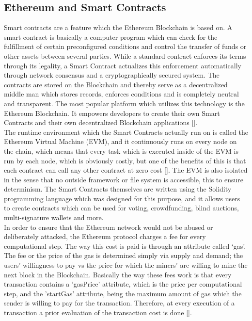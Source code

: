 \subsection{Ethereum and Smart Contracts}
Smart contracts are a feature which the Ethereum Blockchain is based on. A smart contract is basically a computer program which can check for the fulfillment of certain preconfigured conditions and control the transfer of funds or other assets between several parties. While a standard contract enforces its terms through its legality, a Smart Contract actualizes this enforcement automatically through network consensus and a cryptographically secured system. The contracts are stored on the Blockchain and thereby serve as a decentralized middle man which stores records, enforces conditions and is completely neutral and transparent. The most popular platform which utilizes this technology is the Ethereum Blockchain. It empowers developers to create their own Smart Contracts and their own decentralized Blockchain applications [\cite{relatedWork38}].  \\

The runtime environment which the Smart Contracts actually run on is called the Ethereum Virtual Machine (EVM), and it continuously runs on every node on the chain, which means that every task which is executed inside of the EVM is run by each node, which is obviously costly, but one of the benefits of this is that each contract can call any other contract at zero cost [\cite{relatedWork38}]. The EVM is also isolated in the sense that no outside framework or file system is accessible, this to ensure determinism. The Smart Contracts themselves are written using the Solidity programming language which was designed for this purpose, and it allows users to create contracts which can be used for voting, crowdfunding, blind auctions, multi-signature wallets and more.\\

In order to ensure that the Ethereum network would not be abused or deliberately attacked, the Ethereum protocol charges a fee for every computational step. The way this cost is paid is through an attribute called ‘gas’. The fee or the price of the gas is determined simply via supply and demand; the users’ willingness to pay vs the price for which the miners' are willing to mine the next block in the Blockchain. Basically the way these fees work is that every transaction contains a 'gasPrice' attribute, which is the price per computational step, and the 'startGas' attribute, being the maximum amount of gas which the sender is willing to pay for the transaction. Therefore, at every execution of a transaction a prior evaluation of the transaction cost is done [\cite{relatedWork38}].\\

